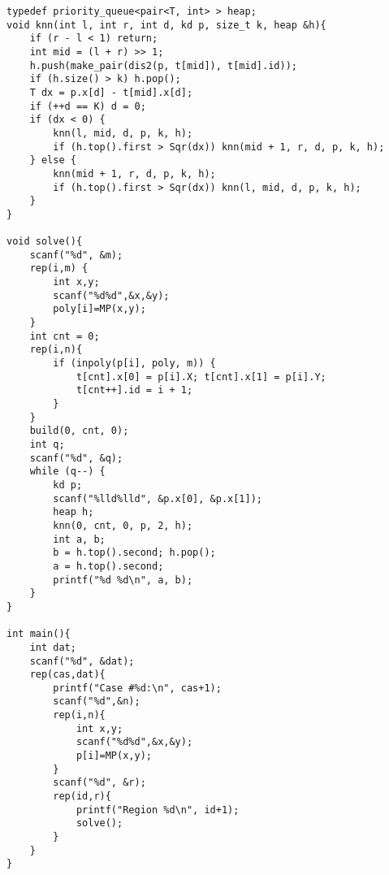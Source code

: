 \begin{verbatim}
typedef priority_queue<pair<T, int> > heap;
void knn(int l, int r, int d, kd p, size_t k, heap &h){
    if (r - l < 1) return;
    int mid = (l + r) >> 1;
    h.push(make_pair(dis2(p, t[mid]), t[mid].id));
    if (h.size() > k) h.pop();
    T dx = p.x[d] - t[mid].x[d];
    if (++d == K) d = 0;
    if (dx < 0) {
        knn(l, mid, d, p, k, h);
        if (h.top().first > Sqr(dx)) knn(mid + 1, r, d, p, k, h);
    } else {
        knn(mid + 1, r, d, p, k, h);
        if (h.top().first > Sqr(dx)) knn(l, mid, d, p, k, h);
    }
}

void solve(){
    scanf("%d", &m);
    rep(i,m) {
        int x,y;
        scanf("%d%d",&x,&y);
        poly[i]=MP(x,y);
    }
    int cnt = 0;
    rep(i,n){
        if (inpoly(p[i], poly, m)) {
            t[cnt].x[0] = p[i].X; t[cnt].x[1] = p[i].Y;
            t[cnt++].id = i + 1;
        }
    }
    build(0, cnt, 0);
    int q;
    scanf("%d", &q);
    while (q--) {
        kd p;
        scanf("%lld%lld", &p.x[0], &p.x[1]);
        heap h;
        knn(0, cnt, 0, p, 2, h);
        int a, b;
        b = h.top().second; h.pop();
        a = h.top().second;
        printf("%d %d\n", a, b);
    }
}

int main(){
    int dat;
    scanf("%d", &dat);
    rep(cas,dat){
        printf("Case #%d:\n", cas+1);
        scanf("%d",&n);
        rep(i,n){
            int x,y;
            scanf("%d%d",&x,&y);
            p[i]=MP(x,y);
        }
        scanf("%d", &r);
        rep(id,r){
            printf("Region %d\n", id+1);
            solve();
        }
    }
}
\end{verbatim}
